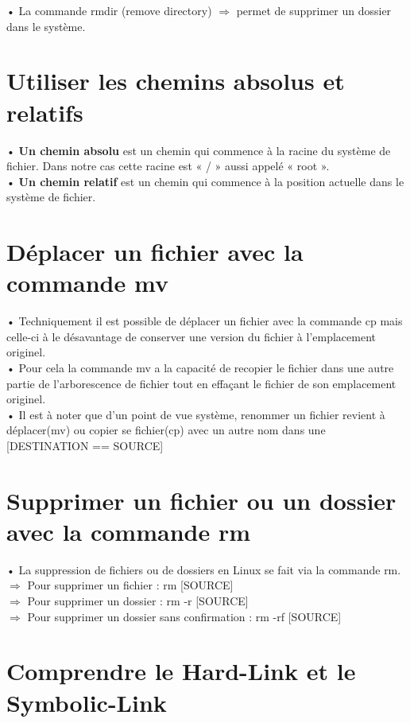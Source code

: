 \documentclass[a4paper, 11pt, french, oneside]{book}
\begin{document}
• La commande rmdir (remove directory) $\Rightarrow$ permet de supprimer un dossier dans le système.


\section{\Large Utiliser les chemins absolus et relatifs} 

• \textbf{Un chemin absolu} est un chemin qui commence à la racine du système de fichier.
 Dans notre cas cette racine est « / » aussi appelé « root ».\\

• \textbf{Un chemin relatif} est un chemin qui commence à la position actuelle dans le système de fichier.

\section{\Large Déplacer un fichier avec la commande mv}

• Techniquement il est possible de déplacer un fichier avec la commande cp mais celle-ci à le désavantage de conserver une version du fichier à l’emplacement originel.\\
• Pour cela la commande mv a la capacité de recopier le fichier dans une autre partie de
l’arborescence de fichier tout en effaçant le fichier de son emplacement originel.\\
• Il est à noter que d’un point de vue système, renommer un fichier revient à déplacer(mv) ou copier se fichier(cp) avec un autre nom dans une [DESTINATION == SOURCE]

\section{\Large Supprimer un fichier ou un dossier avec la commande rm}

• La suppression de fichiers ou de dossiers en Linux se fait via la commande rm.\\
$\Rightarrow$ Pour supprimer un fichier : rm [SOURCE]\\
$\Rightarrow$ Pour supprimer un dossier : rm -r [SOURCE]\\
$\Rightarrow$ Pour supprimer un dossier sans confirmation : rm -rf [SOURCE]

\section{\Large Comprendre le Hard-Link et le Symbolic-Link} 
\end{document}
